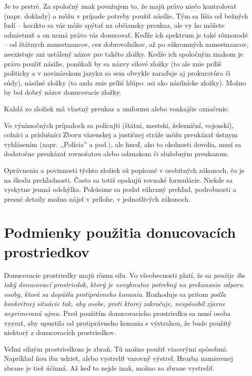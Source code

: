 \documentclass[openany]{book}
\begin{document}
Je to pestré. Za spoločný znak považujem to, že majú právo niečo kontrolovať (napr. doklady) a môžu v prípade potreby použiť násilie. Tým sa líšia od bežných ľudí -- hocikto sa vás môže spýtať na občiansky preukaz, ale vy ho môžete odmietnuť a on nemá právo vás donucovať. Keďže ich spektrum je také rôznorodé -- od štátnych zamestnancov, cez dobrovoľníkov, až po súkromných zamestnancov, neexistuje ani ustálený názov pre takéto zložky. Kedže ich spoločným znakom je právo použiť násilie, ponúkali by sa názvy silové zložky (to ale znie príliš politicky a v novinárskom jazyku sa sem obvykle zaraďuje aj prokuratúra či súdy), násilné zložky (to azda znie príliš hlúpo: asi ako násilnícke zložky). Možno by bol dobrý názov donucovacie zložky. 

Každá zo zložiek má vlastný preukaz a uniformu alebo vonkajšie označenie. 

Vo výnimočných prípadoch sa policajti (štátni, mestskí, železniční, vojenskí), colníci a príslušníci Zboru väzenskej a justičnej stráže môžu preukázať ústnym vyhlásením (napr. ,,Polícia'' a pod.), ale hneď, ako to okolnosti dovolia, musí sa dodatočne preukázať rovnošatou alebo odznakom či služobným preukazom.

Oprávnenia a povinnosti týchto zložiek sú popísané v osobitných zákonoch, čo je na škodu prehľadnosti. Často sa totiž opakujú rovnaké formulácie. Niekde sa vyskytne jemná odchýlka. Pokúsime sa podať súhrnný prehľad, podrobnosti a presné detaily možno nájsť v prílohe, v jednotlivých zákonoch. 

\section{Podmienky použitia donucovacích prostriedkov}

Donucovacie prostriedky majú rôznu silu. Vo všeobecnosti platí, že sa \emph{použije iba taký donucovací prostriedok, ktorý je nevyhnutne potrebný na prekonanie odporu osoby, ktorá sa dopúšťa protiprávneho konania}. Rozhoduje sa pritom \emph{podľa konkrétnej situácie tak, aby osobe, proti ktorej zakročuje, nespôsobil zjavne neprimeranú ujmu.} Pred použitím donucovacieho prostriedku sa musí osoba vyzvať, aby upustila od protiprávneho konania s výstrahou, že bude použitý niektorý z donucovacích prostriedkov.

Veľmi silným prostriedkom je zbraň. Tú možno použiť viacerými spôsobmi. Napríklad ňou iba udrieť, alebo vystreliť varovný výstrel. Hrozba namierenej zbrane je tiež účinná. Až keď to nejde inak, možno zo zbrane vystreliť.
\end{document}
